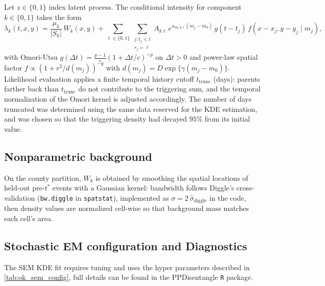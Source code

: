 \documentclass{statsoc}
\newcommand{\1}{\mathbbm{1}}
\begin{document}
Let $z\in\{0,1\}$ index latent process. The conditional intensity for component $k\in\{0,1\}$ takes the form
\[
\lambda_k(t,x,y)
  = \frac{\mu_k}{|S_k|}\, W_k(x,y)
  + \sum_{\ell \in \{0,1\}} \sum_{\substack{j : t_j < t \\ r_j = \ell}}
    A_{k\ell}\, e^{\alpha_{m,k\ell}(m_j - m_0)}\,
    g(t - t_j)\, f(x-x_j, y-y_j \mid m_j),
\]
with Omori-Utsu $g(\Delta t)=\frac{p-1}{c}(1+\Delta t/c)^{-p}$ on $\Delta t>0$ and power-law spatial factor $f \propto (1+r^2/d(m_j))^{-q}$ with $d(m_j)=D\exp\{\gamma(m_j-m_0)\}$. Likelihood evaluation applies a finite temporal history cutoff $t_{\mathrm{trunc}}$ (days): parents farther back than $t_{\mathrm{trunc}}$ do not contribute to the triggering sum, and the temporal normalization of the Omori kernel is adjusted accordingly. The number of days truncated was determined using the same data reserved for the KDE estimation, and was chosen so that the triggering density had decayed $95\%$ from its initial value.

\subsection{Nonparametric background}\label{sec:ok_kde}
On the county partition, $W_k$ is obtained by smoothing the spatial locations of held-out pre-$t^\ast$ events with a Gaussian kernel: bandwidth follows Diggle's cross-validation (\verb|bw.diggle| in \texttt{spatstat}), implemented as $\sigma = 2\,\hat\sigma_{\mathrm{diggle}}$ in the code, then density values are normalized cell-wise so that background mass matches each cell's area.

\subsection{Stochastic EM configuration and Diagnostics}\label{sec:ok_sem_config}

The SEM KDE fit requires tuning and uses the hyper parameters described in \cref{tab:ok_sem_config}, full details can be found in the PPDisentangle \cite{PPDisentangle} \texttt{R} package. 
\end{document}
